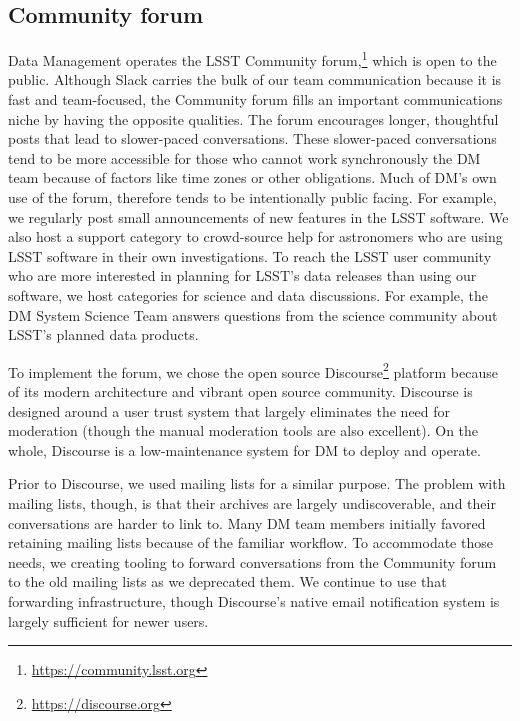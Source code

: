 \subsection{Community forum}
\label{sec:forum}

Data Management operates the LSST Community forum,\footnote{\url{https://community.lsst.org}} which is open to the public.
Although Slack carries the bulk of our team communication because it is fast and team-focused, the Community forum fills an important communications niche by having the opposite qualities.
The forum encourages longer, thoughtful posts that lead to slower-paced conversations.
These slower-paced conversations tend to be more accessible for those who cannot work synchronously the DM team because of factors like time zones or other obligations.
Much of DM's own use of the forum, therefore tends to be intentionally public facing.
For example, we regularly post small announcements of new features in the LSST software.
We also host a support category to crowd-source help for astronomers who are using LSST software in their own investigations.
To reach the LSST user community who are more interested in planning for LSST's data releases than using our software, we host categories for science and data discussions.
For example, the DM System Science Team answers questions from the science community about LSST's planned data products.

To implement the forum, we chose the open source Discourse\footnote{\url{https://discourse.org}} platform because of its modern architecture and vibrant open source community.
Discourse is designed around a user trust system that largely eliminates the need for moderation (though the manual moderation tools are also excellent).
On the whole, Discourse is a low-maintenance system for DM to deploy and operate.

Prior to Discourse, we used mailing lists for a similar purpose.
The problem with mailing lists, though, is that their archives are largely undiscoverable, and their conversations are harder to link to.
Many DM team members initially favored retaining mailing lists because of the familiar workflow.
To accommodate those needs, we creating tooling to forward conversations from the Community forum to the old mailing lists as we deprecated them.
We continue to use that forwarding infrastructure, though Discourse's native email notification system is largely sufficient for newer users.

